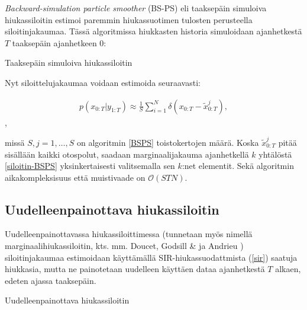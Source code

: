 \documentclass[
  12pt,
  a4paper, twoside]{book}
\begin{document}
\emph{Backward-simulation particle smoother} (BS-PS) eli taaksepäin simuloiva hiukassiloitin estimoi paremmin hiukassuotimen tulosten perusteella siloitinjakaumaa. Tässä algoritmissa hiukkasten historia simuloidaan ajanhetkestä \(T\) taaksepäin ajanhetkeen 0:

\begin{algorithm}[H]
\label{BSPS}
\DontPrintSemicolon
\SetAlgoShortEnd
{}
\caption{Taaksepäin simuloiva hiukassiloitin}
\end{algorithm}

Nyt siloittelujakaumaa voidaan estimoida seuraavasti:

\begin{align}\label{siloitin-BSPS}
p(x_{0:T}|y_{1:T}) \approx \frac{1}{S} \sum_{i=1}^N \delta (x_{0:T}-\tilde{x}_{0:T}^j),
\end{align},

missä \(S, j=1,\ldots,S\) on algoritmin \ref{BSPS} toistokertojen määrä. Koska \(\tilde{x}_{0:T}^j\) pitää sisällään kaikki otospolut, saadaan marginaalijakauma ajanhetkellä \(k\) yhtälöstä \ref{siloitin-BSPS} yksinkertaisesti valitsemalla sen \(k\):net elementit. Sekä algoritmin aikakompleksisuus että muistivaade on \(\mathcal{O}(STN)\).

\subsection{Uudelleenpainottava hiukassiloitin}

Uudelleenpainottavassa hiukassiloittimessa (tunnetaan myös nimellä marginaalihiukassiloitin, kts. mm. Doucet, Godsill \& ja Andrieu \citep{Doucet-2000}) siloitinjakaumaa estimoidaan käyttämällä SIR-hiukassuodattmista (\ref{sir}) saatuja hiukkasia, mutta ne painotetaan uudelleen käyttäen dataa ajanhetkestä \(T\) alkaen, edeten ajassa taaksepäin.

\begin{algorithm}[H]
\label{rwps}
\DontPrintSemicolon
\SetAlgoShortEnd
{}
\caption{Uudelleenpainottava hiukassiloitin}
\end{algorithm}
\end{document}
